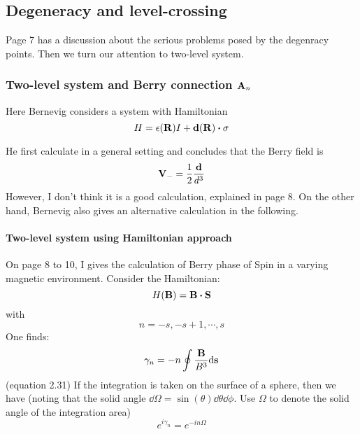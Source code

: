 \subsection{Degeneracy and level-crossing}
\label{sec:Degeneracy-and-level-crossing}
Page 7 has a discussion about the serious problems posed by the
degenracy points. Then we turn our attention to two-level system.

    \subsubsection{Two-level system and Berry connection
    \texorpdfstring{$\vb{A}_n$}{}}
    \label{sec:Two-level-system-and-Berry-connection}
    Here Bernevig considers a system with Hamiltonian
    \begin{equation}
        H = \epsilon(\vb{R}) I + \vb{d}(\vb{R})\vdot\vb{\sigma}
    \end{equation}

    He first calculate in a general setting and concludes that the Berry
    field is
    \begin{equation}
        \vb{V}_{-} = \frac{1}{2}\frac{\vb{d}}{d^3}
    \end{equation}
    However, I don't think it is a good calculation, explained in page 8.
    On the other hand, Bernevig also gives an alternative calculation in
    the following.

        \paragraph{Two-level system using Hamiltonian approach}
        \label{sec:Two-level-system-using-Hamiltonian-approach}
        On page 8 to 10, I gives the calculation of Berry phase of
        Spin in a varying magnetic environment. Consider the
        Hamiltonian:
        \begin{equation}
            H(\vb{B}) = \vb{B}\vdot \vb{S} 
        \end{equation}
        with
        \begin{equation}
            n = -s, -s+1,\cdots, s
        \end{equation}
        One finds:
        \begin{align}
            \gamma_n = - n\oint \frac{\vb{B}}{B^3} \dd\vb{s}
        \end{align}
        (equation 2.31)
        If the integration is taken on the surface of a sphere, then
        we have (noting that the solid angle $\dd
        \Omega=\sin(\theta)\dd\theta\dd\phi$. Use $\Omega$ to denote
        the solid angle of the integration area)
        \begin{equation}
            e^{i\gamma_n} = e^{-i n \Omega}
        \end{equation}

